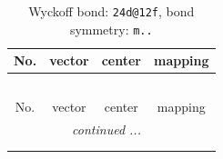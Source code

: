 \documentclass[fleqn,8pt]{jsarticle}
\begin{document}
\renewcommand{\arraystretch}{1.2}
\begin{longtable}{cccc}
\caption{Wyckoff bond: {\tt 24d@12f}, bond symmetry: {\tt m..}}
 \\
 \hline \hline
No. & vector & center & mapping \\ \hline \endfirsthead

\multicolumn{3}{l}{\tablename\ \thetable{}} \\
 \hline \hline
No. & vector & center & mapping \\ \hline \endhead

 \hline \hline
\multicolumn{3}{r}{\footnotesize\it continued ...} \\ \endfoot

 \hline \hline
\multicolumn{3}{r}{} \\ \endlastfoot


\end{longtable}
\end{document}
